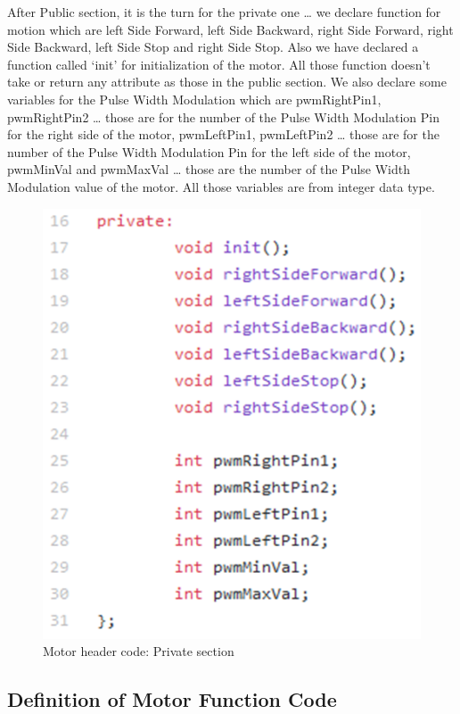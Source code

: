 \documentclass{article}
\begin{document}
\newpage
After Public section, it is the turn for the private one … we declare function for motion which are left Side Forward, left Side Backward, right Side Forward, right Side Backward, left Side Stop and right Side Stop. Also we have declared a function called ‘init’ for initialization of the motor.  All those function doesn’t take or return any attribute as those in the public section. We also declare some variables for the Pulse Width Modulation which are pwmRightPin1, pwmRightPin2 … those are for the number of the Pulse Width Modulation Pin for the right side of the motor, pwmLeftPin1, pwmLeftPin2 … those are for the number of the Pulse Width Modulation Pin for the left side of the motor, pwmMinVal and pwmMaxVal … those are the number of the Pulse Width Modulation value of the motor. All those variables are from integer data type.

\begin{figure}[h]
    \centering
    \includegraphics[width=.7\textwidth]{figures/52.png}
    \caption{Motor header code: Private section}
    \label{fig:my_label}
\end{figure}

\newpage

\subsection{Definition of Motor Function Code}
\end{document}
